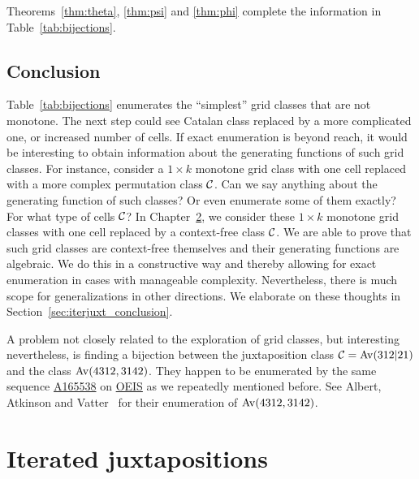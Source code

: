\documentclass[12pt, a4paper, twoside]{report}
\begin{document}
Theorems~\ref{thm:theta}, \ref{thm:psi} and \ref{thm:phi} complete the information in Table~\ref{tab:bijections}.

\section{Conclusion}
\label{sec:conclusion}

Table~\ref{tab:bijections} enumerates the ``simplest'' grid classes that are not monotone. The next step could see Catalan class replaced by a more complicated one, or increased number of cells. If exact enumeration is beyond reach, it would be interesting to obtain information about the generating functions of such grid classes. For instance, consider a $1\times k$ monotone grid class with one cell replaced with a more complex permutation class $\mathcal{C}$. Can we say anything about the generating function of such classes? Or even enumerate some of them exactly? For what type of cells $\mathcal{C}$? In Chapter~\ref{chap:iterjuxt}, we consider these $1\times k$ monotone grid classes with one cell replaced by a context-free class $\mathcal{C}$. We are able to prove that such grid classes are context-free themselves and their generating functions are algebraic. We do this in a constructive way and thereby allowing for exact enumeration in cases with manageable complexity. Nevertheless, there is much scope for generalizations in other directions. We elaborate on these thoughts in Section~\ref{sec:iterjuxt_conclusion}.

A problem not closely related to the exploration of grid classes, but interesting nevertheless, is finding a bijection between the juxtaposition class $\mathcal{C} = \mathrm{Av}(312|21)$ and the class $\mathrm{Av}(4312, 3142)$. They happen to be enumerated by the same sequence \href{http://oeis.org/A165538}{A165538} on \href{http://oeis.org}{OEIS} as we repeatedly mentioned before. See Albert, Atkinson and Vatter~\cite{albert2012inflations} for their enumeration of $\mathrm{Av}(4312, 3142)$. 


\chapter{Iterated juxtapositions}
\label{chap:iterjuxt}
%
\end{document}
